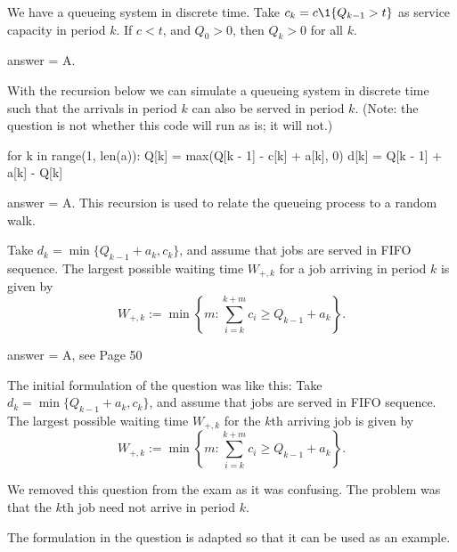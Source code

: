 \begin{exercise}[201902]
  We have a queueing system in discrete time. Take $c_k = c\1{Q_{k-1} > t}$ as service capacity in period $k$. If $c < t$, and $Q_0 > 0$, then $Q_k > 0$ for all $k$. 
\begin{solution}
answer = A.
\end{solution}
\end{exercise}

\begin{exercise}[201902]
  With the recursion below we can simulate a queueing system in discrete time such that the arrivals in period $k$ can also be served in period $k$.
  (Note: the question is not whether this code will run as is; it will not.)
\begin{pyverbatim}
for k in range(1, len(a)):
    Q[k] = max(Q[k - 1] - c[k] + a[k], 0)
    d[k] = Q[k - 1] + a[k] - Q[k]

\end{pyverbatim}

\begin{solution}
answer = A. This recursion is used to relate the queueing process to a random walk.
\end{solution}
\end{exercise}

\begin{exercise}[201902]
Take  $d_k = \min\{Q_{k-1}+a_k, c_k\}$, and assume that jobs are served in
  FIFO sequence. The  largest possible waiting time $W_{+, k}$ for a  job arriving in period $k$ is given by 
    \begin{equation*}
      W_{+,k}:= \min\left\{m: \sum_{i=k}^{k+m} c_i \geq
        Q_{k-1}+a_k\right\}.
    \end{equation*}

\begin{solution}
answer = A, see Page 50



The initial formulation of the question was like this: Take  $d_k = \min\{Q_{k-1}+a_k, c_k\}$, and assume that jobs are served in
  FIFO sequence. The  largest possible waiting time $W_{+, k}$ for the $k$th arriving job is given by 
    \begin{equation*}
      W_{+,k}:= \min\left\{m: \sum_{i=k}^{k+m} c_i \geq
        Q_{k-1}+a_k\right\}.
    \end{equation*}

    We  removed this question from the exam as it  was confusing. The problem was that the $k$th job need not arrive in period $k$.

    The formulation in the question is adapted so that it can be used as an example. 

\end{solution}
\end{exercise}

